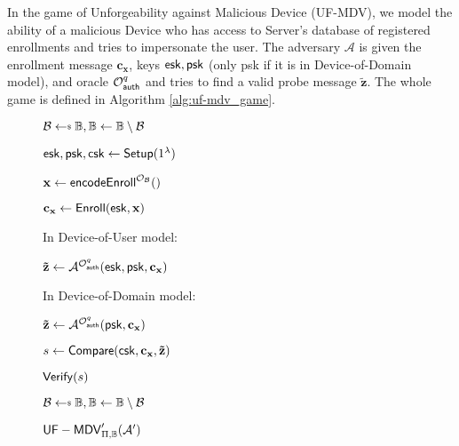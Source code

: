In the game of Unforgeability against Malicious Device (UF-MDV), we model the ability of a malicious {\sf Device} who has access to {\sf Server}'s database of registered enrollments and tries to impersonate the user. The adversary $\mathcal{A}$ is given the enrollment message $\mathbf{c_x}$, keys ${\sf esk}, {\sf psk}$ (only {\sf psk} if it is in Device-of-Domain model), and oracle $\mathcal{O}_{\sf auth}^q$ and tries to find a valid probe message $\mathbf{\tilde{z}}$. The whole game is defined in Algorithm \ref{alg:uf-mdv_game}.


\begin{figure}[h]
\centering

	\begin{minipage}[t]{0.45\linewidth}
	\begin{algorithm}[H]
	\caption{${\sf UF-MDV}_{\Pi, \mathbb{B}}(\mathcal{A})$}
	\label{alg:uf-mdv_game}
	\begin{algorithmic}[1]
		\State $\mathcal{B} \getsdollar \mathbb{B}, \mathbb{B} \gets \mathbb{B} \setminus \mathcal{B}$

		\State ${\sf esk}, {\sf psk}, {\sf csk} \gets {\sf Setup}(1^\lambda)$

		\State $\mathbf{x} \gets {\sf encodeEnroll}^{\mathcal{O}_{\mathcal{B}}}()$

		\State $\mathbf{c_x} \gets {\sf Enroll}({\sf esk}, \mathbf{x})$

		\State In Device-of-User model:
		
		\State \hspace{\algorithmicindent} ${\mathbf{\tilde{z}}} \gets \mathcal{A}^{ \mathcal{O}_{\sf auth}^q } ({\sf esk}, {\sf psk}, \mathbf{c_x} )$

		\State In Device-of-Domain model:
		
		\State \hspace{\algorithmicindent} ${\mathbf{\tilde{z}}} \gets \mathcal{A}^{ \mathcal{O}_{\sf auth}^q } ( {\sf psk}, \mathbf{c_x} )$

		\State $s \gets {\sf Compare}( {\sf csk}, \mathbf{c_x}, \mathbf{\tilde{z}} )$

		\State \Return ${\sf Verify}(s)$
	\end{algorithmic}
	\end{algorithm}
	\end{minipage}
	\begin{minipage}[t]{0.45\linewidth}
	\begin{algorithm}[H]
	\caption{${\sf UF-MDV}^\prime_{\Pi, \mathbb{B}}(\mathcal{A'})$}
	\label{alg:plain_uf-mdv_game}
	\begin{algorithmic}[1]
		\State $\mathcal{B} \getsdollar \mathbb{B}, \mathbb{B} \gets \mathbb{B} \setminus \mathcal{B}$


\end{algorithmic}
\end{algorithm}
\end{minipage}
\end{figure}
